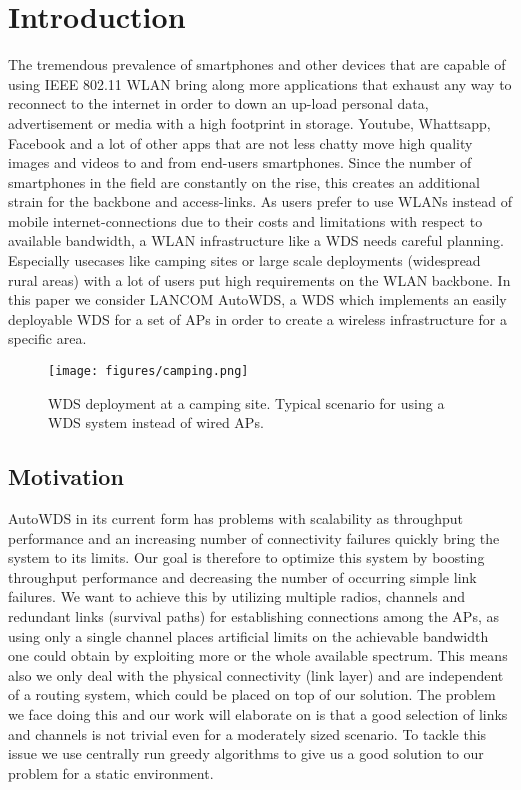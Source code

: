 \chapter{Introduction}
  The tremendous prevalence of smartphones and other devices that are capable of using IEEE 802.11 \ac{WLAN} bring along 
  more applications that exhaust any way to reconnect to the internet in order to 
  down an up-load personal data, advertisement or media with a high footprint in storage.
  Youtube, Whattsapp, Facebook and a lot of other apps that are not less chatty move high quality images and videos 
  to and from end-users smartphones. Since the number of smartphones in the field are constantly on the rise, this creates an additional strain for
  the backbone and access-links. As users prefer to use WLANs instead of mobile internet-connections due to their costs and limitations with respect to available bandwidth,
  a \ac{WLAN} infrastructure like a \ac{WDS} needs careful planning. Especially usecases like camping sites or large scale deployments (widespread rural areas) with a lot of users
  put high requirements on the \ac{WLAN} backbone. 
  In this paper we consider LANCOM AutoWDS, a \ac{WDS} which implements an easily deployable \ac{WDS} for a set of APs in order to create a wireless 
  infrastructure for a specific area.

  \begin{figure}[h]
    \centering
    \texttt{[image: figures/camping.png]}
    \caption{WDS deployment at a camping site. Typical scenario for using a \ac{WDS} system instead of wired APs.}
    \label{fig:camping}
  \end{figure}
  
\section{Motivation}
  AutoWDS in its current form has problems with scalability as throughput performance and an increasing number of connectivity failures quickly bring the system to its limits.
  Our goal is therefore to optimize this system by boosting throughput performance and decreasing the number of occurring simple link failures.
  We want to achieve this by utilizing multiple radios, channels and redundant links (survival paths) for establishing connections among the APs, as using only a single
  channel places artificial limits on the achievable bandwidth one could obtain by exploiting more or the whole available spectrum.
  This means also we only deal with the physical connectivity (link layer) and are independent of a routing system, which could be placed on top of our solution.
  The problem we face doing this and our work will elaborate on is that a good selection of links and channels is not trivial even for a moderately sized scenario.
  To tackle this issue we use centrally run greedy algorithms to give us a good solution to our problem for a static environment.
  
